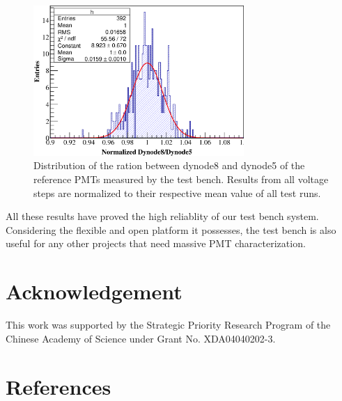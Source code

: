 \documentclass[5p, times]{elsarticle}
\begin{document}
\begin{figure}
 \centering
 \includegraphics[width=80mm]{RefDy58Dist}
\caption{Distribution of the ration between dynode8 and dynode5 of the reference PMTs measured by the test bench.
Results from all voltage steps are normalized to their respective mean value of all test runs.}
\label{fig:dy58_stabiltiy}
\end{figure} 

All these results have proved the high reliablity of our test bench system.
Considering the flexible and open platform it possesses, the test bench is also useful for any other projects that need massive PMT characterization. 

\section*{Acknowledgement}

This work was supported by the Strategic Priority Research Program of the Chinese Academy of Science under Grant No. XDA04040202-3.


\section*{References}

\end{document}
